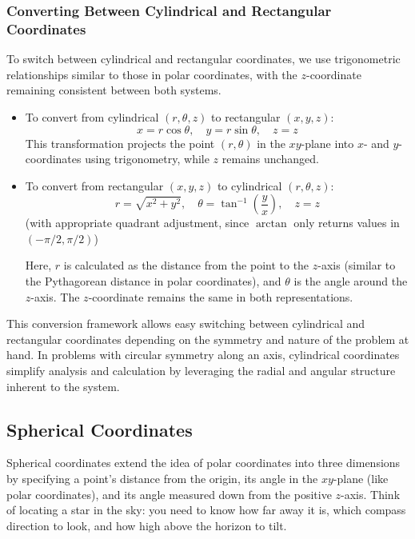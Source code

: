 \subsubsection*{Converting Between Cylindrical and Rectangular Coordinates}
To switch between cylindrical and rectangular coordinates, we use trigonometric relationships similar to those in polar coordinates, with the \( z \)-coordinate remaining consistent between both systems.

\begin{itemize}
    \item To convert from cylindrical \( (r, \theta, z) \) to rectangular \( (x, y, z) \):
    \[
    x = r \cos \theta, \quad y = r \sin \theta, \quad z = z
    \]
    This transformation projects the point \( (r, \theta) \) in the \( xy \)-plane into \( x \)- and \( y \)-coordinates using trigonometry, while \( z \) remains unchanged.

    \item To convert from rectangular \( (x, y, z) \) to cylindrical \( (r, \theta, z) \):
    \[
    r = \sqrt{x^2 + y^2}, \quad \theta = \tan^{-1} \left( \frac{y}{x} \right), \quad z = z
    \]
    (with appropriate quadrant adjustment, since \( \arctan \) only returns values in \( (-\pi/2, \pi/2) \))

    Here, \( r \) is calculated as the distance from the point to the \( z \)-axis (similar to the Pythagorean distance in polar coordinates), and \( \theta \) is the angle around the \( z \)-axis. The \( z \)-coordinate remains the same in both representations.
\end{itemize}

\noindent This conversion framework allows easy switching between cylindrical and rectangular coordinates depending on the symmetry and nature of the problem at hand. In problems with circular symmetry along an axis, cylindrical coordinates simplify analysis and calculation by leveraging the radial and angular structure inherent to the system.


\subsection*{Spherical Coordinates} 

Spherical coordinates extend the idea of polar coordinates into three dimensions by specifying a point's distance from the origin, its angle in the \( xy \)-plane (like polar coordinates), and its angle measured down from the positive \( z \)-axis. Think of locating a star in the sky: you need to know how far away it is, which compass direction to look, and how high above the horizon to tilt.


